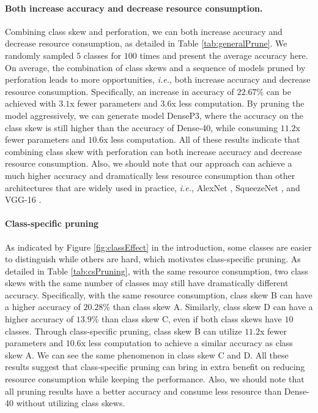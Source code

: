 \documentclass[pageno]{jpaper}
\begin{document}
\paragraph{Both increase accuracy and decrease resource consumption.}
Combining class skew and perforation, we can both increase accuracy and decrease resource consumption, as detailed in Table \ref{tab:generalPrune}. We randomly sampled $5$ classes for $100$ times and present the average accuracy here. On average, the combination of class skews and a sequence of models pruned by perforation leads to more opportunities, \textit{i.e.}, both increase accuracy and decrease resource consumption. Specifically, an increase in accuracy of $22.67\%$ can be achieved with $3.1$x fewer parameters and $3.6$x less computation. By pruning the model aggressively, we can generate model DenseP3, where the accuracy on the class skew is still higher than the accuracy of Dense-40, while consuming $11.2$x fewer parameters and $10.6$x less computation. All of these results indicate that combining class skew with perforation can both increase accuracy and decrease resource consumption. Also, we should note that our approach can achieve a much higher accuracy and dramatically less resource consumption than other architectures that are widely used in practice, \textit{i.e.}, AlexNet \cite{ahmed2016network, NIPS2012_4824}, SqueezeNet \cite{iandola2016squeezenet}, and VGG-16 \cite{simonyan2014very}.

\paragraph{Class-specific pruning}
As indicated by Figure \ref{fig:classEffect} in the introduction, some classes are easier to distinguish while others are hard, which motivates class-specific pruning. As detailed in Table \ref{tab:csPruning}, with the same resource consumption, two class skews with the same number of classes may still have dramatically different accuracy. Specifically, with the same resource consumption, class skew B can have a higher accuracy of $20.28$\% than class skew A. Similarly, class skew D can have a higher accuracy of $13.9$\% than class skew C, even if both class skews have $10$ classes. Through class-specific pruning, class skew B can utilize $11.2$x fewer parameters and $10.6$x less computation to achieve a similar accuracy as class skew A. We can see the same phenomenon in class skew C and D. All these results suggest that class-specific pruning can bring in extra benefit on reducing resource consumption while keeping the performance. Also, we should note that all pruning results have a better accuracy and consume less resource than Dense-40 without utilizing class skews.
\end{document}
